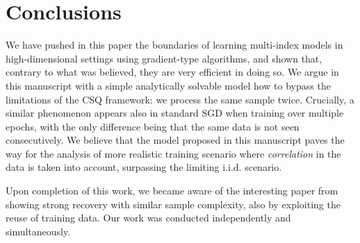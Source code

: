 \section{Conclusions}
 We have pushed in this paper the boundaries of learning multi-index models in high-dimensional settings using gradient-type algorithms, and shown that, contrary to what was believed, they are very efficient in doing so. We argue in this manuscript with a simple analytically solvable model how to bypass the limitations of the CSQ framework: we process the same sample twice. Crucially, a similar phenomenon appears also in standard SGD when training over multiple epochs, with the only difference being that the same data is not seen consecutively. We believe that the model proposed in this manuscript paves the way for the analysis of more realistic training scenario where \textit{correlation} in the data is taken into account, surpassing the limiting i.i.d. scenario.


Upon completion of this work, we became aware of the interesting paper from \citep{lee2024neural} showing strong recovery with similar sample complexity, also by exploiting the reuse of training data. Our work was conducted independently and simultaneously.